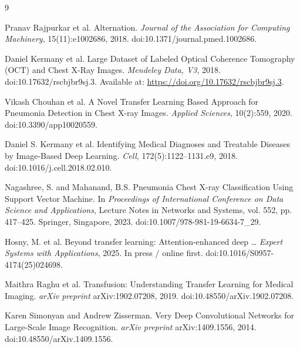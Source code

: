 \documentclass[11pt]{article}
\begin{document}
\pagebreak
\begin{thebibliography}{9}  %

Pranav Rajpurkar et al.
\newblock Alternation.
\newblock \emph{Journal of the Association for Computing Machinery}, 15(11):e1002686, 2018.
\newblock doi:10.1371/journal.pmed.1002686.

Daniel Kermany et al.
\newblock Large Dataset of Labeled Optical Coherence Tomography (OCT) and Chest X-Ray Images.
\newblock \emph{Mendeley Data, V3}, 2018.
\newblock doi:10.17632/rscbjbr9sj.3.
\newblock Available at: \url{https://doi.org/10.17632/rscbjbr9sj.3}.

Vikash Chouhan et al.
\newblock A Novel Transfer Learning Based Approach for Pneumonia Detection in Chest X-ray Images.
\newblock \emph{Applied Sciences}, 10(2):559, 2020.
\newblock doi:10.3390/app10020559.

Daniel S. Kermany et al.
\newblock Identifying Medical Diagnoses and Treatable Diseases by Image-Based Deep Learning.
\newblock \emph{Cell}, 172(5):1122--1131.e9, 2018.
\newblock doi:10.1016/j.cell.2018.02.010.

Nagashree, S. and Mahanand, B.S.
\newblock Pneumonia Chest X-ray Classification Using Support Vector Machine.
\newblock In \emph{Proceedings of International Conference on Data Science and Applications},
Lecture Notes in Networks and Systems, vol. 552, pp. 417--425. Springer, Singapore, 2023.
\newblock doi:10.1007/978-981-19-6634-7\_29.

Hosny, M. et al.
\newblock Beyond transfer learning: Attention-enhanced deep … 
\newblock \emph{Expert Systems with Applications}, 2025. In press / online first.
\newblock doi:10.1016/S0957-4174(25)024698.

Maithra Raghu et al.
\newblock Transfusion: Understanding Transfer Learning for Medical Imaging.
\newblock \emph{arXiv preprint} arXiv:1902.07208, 2019.
\newblock doi:10.48550/arXiv.1902.07208.

Karen Simonyan and Andrew Zisserman.
\newblock Very Deep Convolutional Networks for Large-Scale Image Recognition.
\newblock \emph{arXiv preprint} arXiv:1409.1556, 2014.
\newblock doi:10.48550/arXiv.1409.1556.

\end{thebibliography}
\end{document}
